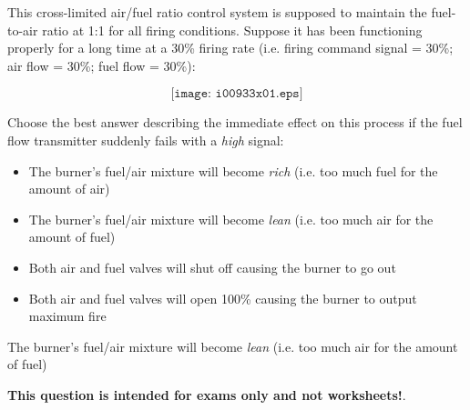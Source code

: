 

This cross-limited air/fuel ratio control system is supposed to maintain the fuel-to-air ratio at 1:1 for all firing conditions.  Suppose it has been functioning properly for a long time at a 30\% firing rate (i.e. firing command signal = 30\%; air flow = 30\%; fuel flow = 30\%):

$$\texttt{[image: i00933x01.eps]}$$

\noindent
Choose the best answer describing the immediate effect on this process if the fuel flow transmitter suddenly fails with a {\it high} signal:

\begin{itemize}
\item{} The burner's fuel/air mixture will become {\it rich} (i.e. too much fuel for the amount of air)
\vskip 10pt
\item{} The burner's fuel/air mixture will become {\it lean} (i.e. too much air for the amount of fuel)
\vskip 10pt
\item{} Both air and fuel valves will shut off causing the burner to go out
\vskip 10pt
\item{} Both air and fuel valves will open 100\% causing the burner to output maximum fire
\end{itemize}







The burner's fuel/air mixture will become {\it lean} (i.e. too much air for the amount of fuel)







{\bf This question is intended for exams only and not worksheets!}.



